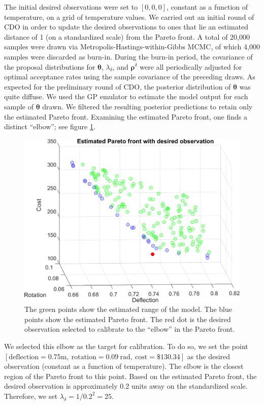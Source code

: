 \documentclass{article}
\begin{document}
The initial desired observations were set to $[0,0,0]$, constant as a function of temperature, on a grid of temperature values.
%
We carried out an initial round of CDO in order to update the desired observations to ones that lie an estimated distance of 1 (on a standardized scale) from the Pareto front.
%
A total of 20,000 samples were drawn via Metropolis-Hastings-within-Gibbs MCMC, of which 4,000 samples were discarded as burn-in. 
%
During the burn-in period, the covariance of the proposal distributions for $\boldsymbol \theta$, $\lambda_\delta$, and $\boldsymbol\rho^\delta$ were all periodically adjusted for optimal acceptance rates using the sample covariance of the preceding draws.
%
%
%
As expected for the preliminary round of CDO, the posterior distribution of $\boldsymbol\theta$ was quite diffuse.
%
We used the GP emulator to estimate the model output for each sample of $\boldsymbol \theta$ drawn.
%
We filtered the resulting posterior predictions to retain only the estimated Pareto front.
%
Examining the estimated Pareto front, one finds a distinct ``elbow''; see figure \ref{fig:elbow}.
%
\begin{figure}
\centering
\includegraphics[width=.7\linewidth]{FIG_est_PF_with_des_obs}
\captionsetup{width=.7\linewidth}
\caption{The green points show the estimated range of the model. The blue points show the estimated Pareto front. The red dot is the desired observation selected to calibrate to the ``elbow'' in the Pareto front.}
\label{fig:elbow}
\end{figure}
%
We selected this elbow as the target for calibration.
%
To do so, we set the point $[\mathrm{deflection}=0.75\mathrm m,\ 
\mathrm{rotation}=0.09\ \mathrm{rad},\ 
\mathrm{cost}=\$130.34]$
 as the desired observation (constant as a function of temperature).
%
The elbow is the closest region of the Pareto front to this point.
%
Based on the estimated Pareto front, the desired observation is approximately 0.2 units away on the standardized scale.
%
Therefore, we set $\lambda_\delta=1/0.2^2=25.$
%
\end{document}
